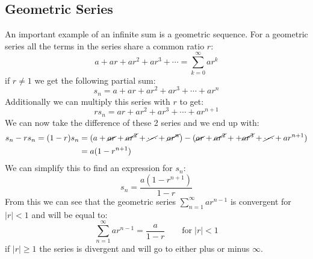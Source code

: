 \documentclass[11pt, a4paper]{article}
\begin{document}
\subsection{Geometric Series}
An important example of an infinite sum is a geometric sequence. For a geometric series all the terms in the series share a common ratio $r$:
\begin{equation*}
  a + ar + ar^2 + ar^3 + \cdots = \sum_{k=0}^{\infty} ar^k
\end{equation*}
if $r\neq 1$ we get the following partial sum:
\begin{equation*}
  s_n = a + ar + ar^2 + ar^3 + \cdots + ar^n
\end{equation*}
Additionally we can multiply this series with $r$ to get:
\begin{equation*}
  rs_n = ar + ar^2 + ar^3 + \cdots + ar^{n+1}
\end{equation*}
We can now take the difference of these 2 series and we end up with:
\begin{align*}
  s_n - rs_n = (1 - r)s_n &= (a + \cancel{ar} + \cancel{ar^2} + \cancel{\cdots} + \cancel{ar^n}) - (\cancel{ar} + \cancel{ar^2} + + \cancel{ar^3} + \cancel{\cdots} + ar^{n+1})\\
  &= a(1 - r^{n+1})
\end{align*}
We can simplify this to find an expression for $s_n$:
\begin{equation*}
  s_n = \frac{a(1-r^{n+1})}{1-r}
\end{equation*}
From this we can see that the geometric series $\sum_{n=1}^\infty ar^{n-1}$ is convergent for $|r| < 1$ and will be equal to:
\begin{equation*}
  \sum_{n=1}^\infty ar^{n-1} = \frac{a}{1-r} \qquad \text{for} \; |r| < 1
\end{equation*}
if $|r|\geq 1$ the series is divergent and will go to either plus or minus $\infty$.
\end{document}
